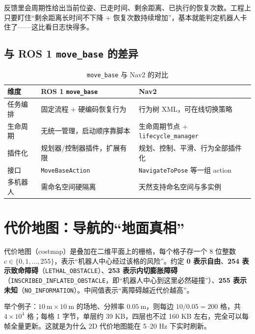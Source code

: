 反馈里会周期性给出当前位姿、已走时间、剩余距离、已执行的恢复次数。工程上只要盯住“剩余距离长时间不下降 + 恢复次数持续增加”，基本就能判定机器人卡住了——这比看日志快得多。

\subsection{与 ROS 1 \texttt{move\_base} 的差异}

\begin{table}[htbp]
  \centering
  \caption{\texttt{move\_base} 与 Nav2 的对比}
  \label{tab:18-movebase}
  \small
  \begin{tabular}{p{2.6cm}p{4.6cm}p{5.4cm}}
    \toprule
    维度 & ROS 1 \texttt{move\_base} & Nav2 \\
    \midrule
    任务编排 & 固定流程 + 硬编码恢复行为 & 行为树 XML，可在线切换策略 \\
    生命周期 & 无统一管理，启动顺序靠脚本 & 生命周期节点 + \texttt{lifecycle\_manager} \\
    插件化 & 规划器/控制器插件，扩展有限 & 规划、控制、平滑、行为全部插件化 \\
    接口 & \texttt{MoveBaseAction} & \texttt{NavigateToPose} 等一组 action \\
    多机器人 & 需命名空间硬隔离 & 天然支持命名空间与多实例 \\
    \bottomrule
  \end{tabular}
\end{table}

\section{代价地图：导航的“地面真相”}\label{sec:18-costmap}

\begin{definition}[代价地图]
代价地图（costmap）是叠加在二维平面上的栅格，每个格子存一个 8 位整数 $c\in\{0,1,\dots,255\}$，表示“机器人中心经过该格的风险”。约定 \textbf{0 表示自由}、\textbf{254 表示致命障碍}（\texttt{LETHAL\_OBSTACLE}）、\textbf{253 表示内切膨胀障碍}（\texttt{INSCRIBED\_INFLATED\_OBSTACLE}，即“机器人中心到这里必然碰撞”）、\textbf{255 表示未知}（\texttt{NO\_INFORMATION}）。中间值表示“离障碍越近代价越高”。
\end{definition}

举个例子：$10\ \mathrm{m}\times 10\ \mathrm{m}$ 的场地、分辨率 $0.05\ \mathrm{m}$，则每边 $10/0.05=200$ 格，共 $4\times10^4$ 格；每格 1 字节，单层约 39 KB，四层也不过 160 KB 左右，完全可以每帧全量更新。这就是为什么 2D 代价地图能在 5--20 Hz 下实时刷新。

